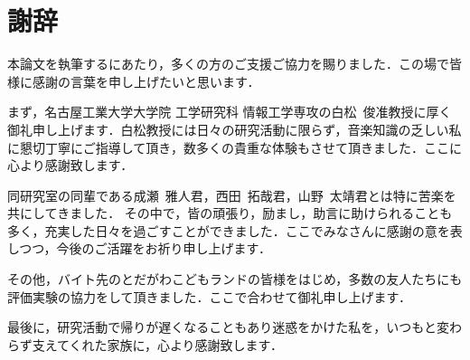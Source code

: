 \chapter*{謝辞}
本論文を執筆するにあたり，多くの方のご支援ご協力を賜りました．この場で皆様に感謝の言葉を申し上げたいと思います．

まず，名古屋工業大学大学院 工学研究科 情報工学専攻の白松~俊准教授に厚く御礼申し上げます．白松教授には日々の研究活動に限らず，音楽知識の乏しい私に懇切丁寧にご指導して頂き，数多くの貴重な体験もさせて頂きました．ここに心より感謝致します．


同研究室の同輩である成瀬~雅人君，西田~拓哉君，山野~太靖君とは特に苦楽を共にしてきました．
その中で，皆の頑張り，励まし，助言に助けられることも多く，充実した日々を過ごすことができました．ここでみなさんに感謝の意を表しつつ，今後のご活躍をお祈り申し上げます．

その他，バイト先のとだがわこどもランドの皆様をはじめ，多数の友人たちにも評価実験の協力をして頂きました．ここで合わせて御礼申し上げます．

最後に，研究活動で帰りが遅くなることもあり迷惑をかけた私を，いつもと変わらず支えてくれた家族に，心より感謝致します．

\vspace*{4.5mm}

\begin{flushright}
\vspace*{1.8mm}
\end{flushright}